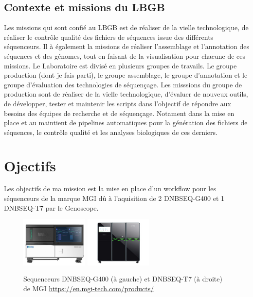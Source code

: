 \subsection{Contexte et missions du LBGB}
Les missions qui sont confié au LBGB est de réaliser de la vielle technologique, de réaliser le contrôle qualité des fichiers de séquences issue des différents séquenceurs. Il à également la missions de réaliser l'assemblage et l'annotation des séquences et des génomes, tout en faisant de la visualisation pour chacune de ces missions. Le Laboratoire est divisé en plusieurs groupes de travails. Le groupe production (dont je fais parti), le groupe assemblage, le groupe d'annotation et le groupe d'évaluation des technologies de séquençage. Les misssions du groupe de production sont de réaliser de la vielle technologique, d'évaluer de nouveux outils, de développer, tester et maintenir les scripts dans l'objectif de répondre aux besoins des équipes de recherche et de séquençage. Notament dans la mise en place et au maintient de pipelines automatiques pour la génération des fichiers de séquences, le contrôle qualité et les analyses biologiques de ces derniers.
\section{Ojectifs}
Les objectifs de ma mission est la mise en place d'un workflow pour les séquenceurs de la marque \textsc{MGI} dû à l'aquisition de 2 DNBSEQ-G400 et 1 DNBSEQ-T7 par le Genoscope.

\begin{figure}[H]
	\centering
	\includegraphics[width=0.3\textwidth]{img/MGI_G400.jpg}
    \hspace{2.5cm}
    \includegraphics[width=0.3\textwidth]{img/MGI_T7.jpg}
    \caption{Sequenceurs DNBSEQ-G400 (à gauche) et DNBSEQ-T7 (à droite) de \textsc{MGI} \href{https://en.mgi-tech.com/products/}{https://en.mgi-tech.com/products/}}
	\label{seq-MGI}
\end{figure}

